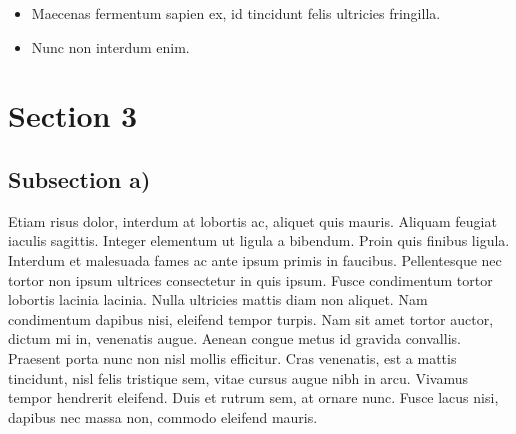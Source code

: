 \documentclass{article} %
\begin{document}
\begin{itemize}
	\item[] Maecenas fermentum sapien ex, id tincidunt felis ultricies fringilla.
	\item[] Nunc non interdum enim.
\end{itemize}

\newpage
\section{Section 3}
\subsection{Subsection a)}
Etiam risus dolor, interdum at lobortis ac, aliquet quis mauris. Aliquam feugiat iaculis sagittis. Integer elementum ut ligula a bibendum. Proin quis finibus ligula. Interdum et malesuada fames ac ante ipsum primis in faucibus. Pellentesque nec tortor non ipsum ultrices consectetur in quis ipsum. Fusce condimentum tortor lobortis lacinia lacinia. Nulla ultricies mattis diam non aliquet. Nam condimentum dapibus nisi, eleifend tempor turpis. Nam sit amet tortor auctor, dictum mi in, venenatis augue. Aenean congue metus id gravida convallis. Praesent porta nunc non nisl mollis efficitur. Cras venenatis, est a mattis tincidunt, nisl felis tristique sem, vitae cursus augue nibh in arcu. Vivamus tempor hendrerit eleifend. Duis et rutrum sem, at ornare nunc. Fusce lacus nisi, dapibus nec massa non, commodo eleifend mauris.
\\
\end{document}
